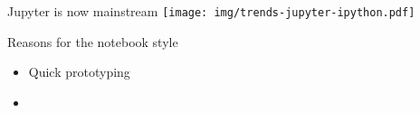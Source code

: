 \documentclass[aspectratio=169]{beamer}
\begin{document}
\begin{frame}{Jupyter is now mainstream}
\vspace{0.5 cm}
\texttt{[image: img/trends-jupyter-ipython.pdf]}
\end{frame}

\begin{frame}{Reasons for the notebook style}
\Large
\begin{itemize}
\item Quick prototyping
\item 


\end{itemize}
\end{frame}
\end{document}
